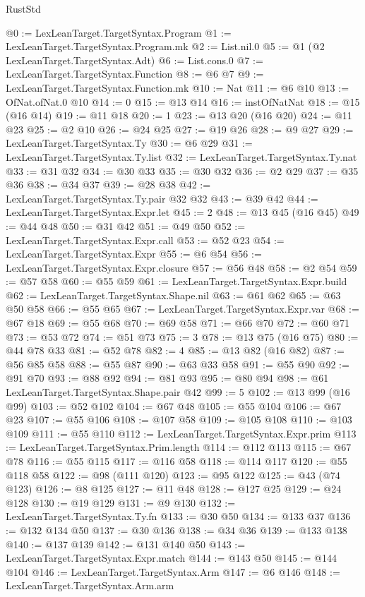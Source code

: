 \begin{lexlean}{RustStd}
\begin{coremodule}
{\begin{coremodule}
{{{{{{{{{{{{{@0 := LexLeanTarget.TargetSyntax.Program
@1 := LexLeanTarget.TargetSyntax.Program.mk
@2 := List.nil.{0}
@5 := @1 (@2 LexLeanTarget.TargetSyntax.Adt)
@6 := List.cons.{0}
@7 := LexLeanTarget.TargetSyntax.Function
@8 := @6 @7
@9 := LexLeanTarget.TargetSyntax.Function.mk
@10 := Nat
@11 := @6 @10
@13 := OfNat.ofNat.{0} @10
@14 := 0
@15 := @13 @14
@16 := instOfNatNat
@18 := @15 (@16 @14)
@19 := @11 @18
@20 := 1
@23 := @13 @20 (@16 @20)
@24 := @11 @23
@25 := @2 @10
@26 := @24 @25
@27 := @19 @26
@28 := @9 @27
@29 := LexLeanTarget.TargetSyntax.Ty
@30 := @6 @29
@31 := LexLeanTarget.TargetSyntax.Ty.list
@32 := LexLeanTarget.TargetSyntax.Ty.nat
@33 := @31 @32
@34 := @30 @33
@35 := @30 @32
@36 := @2 @29
@37 := @35 @36
@38 := @34 @37
@39 := @28 @38
@42 := LexLeanTarget.TargetSyntax.Ty.pair @32 @32
@43 := @39 @42
@44 := LexLeanTarget.TargetSyntax.Expr.let
@45 := 2
@48 := @13 @45 (@16 @45)
@49 := @44 @48
@50 := @31 @42
@51 := @49 @50
@52 := LexLeanTarget.TargetSyntax.Expr.call
@53 := @52 @23
@54 := LexLeanTarget.TargetSyntax.Expr
@55 := @6 @54
@56 := LexLeanTarget.TargetSyntax.Expr.closure
@57 := @56 @48
@58 := @2 @54
@59 := @57 @58
@60 := @55 @59
@61 := LexLeanTarget.TargetSyntax.Expr.build
@62 := LexLeanTarget.TargetSyntax.Shape.nil
@63 := @61 @62
@65 := @63 @50 @58
@66 := @55 @65
@67 := LexLeanTarget.TargetSyntax.Expr.var
@68 := @67 @18
@69 := @55 @68
@70 := @69 @58
@71 := @66 @70
@72 := @60 @71
@73 := @53 @72
@74 := @51 @73
@75 := 3
@78 := @13 @75 (@16 @75)
@80 := @44 @78 @33
@81 := @52 @78
@82 := 4
@85 := @13 @82 (@16 @82)
@87 := @56 @85 @58
@88 := @55 @87
@90 := @63 @33 @58
@91 := @55 @90
@92 := @91 @70
@93 := @88 @92
@94 := @81 @93
@95 := @80 @94
@98 := @61 LexLeanTarget.TargetSyntax.Shape.pair @42
@99 := 5
@102 := @13 @99 (@16 @99)
@103 := @52 @102
@104 := @67 @48
@105 := @55 @104
@106 := @67 @23
@107 := @55 @106
@108 := @107 @58
@109 := @105 @108
@110 := @103 @109
@111 := @55 @110
@112 := LexLeanTarget.TargetSyntax.Expr.prim
@113 := LexLeanTarget.TargetSyntax.Prim.length
@114 := @112 @113
@115 := @67 @78
@116 := @55 @115
@117 := @116 @58
@118 := @114 @117
@120 := @55 @118 @58
@122 := @98 (@111 @120)
@123 := @95 @122
@125 := @43 (@74 @123)
@126 := @8 @125
@127 := @11 @48
@128 := @127 @25
@129 := @24 @128
@130 := @19 @129
@131 := @9 @130
@132 := LexLeanTarget.TargetSyntax.Ty.fn
@133 := @30 @50
@134 := @133 @37
@136 := @132 @134 @50
@137 := @30 @136
@138 := @34 @36
@139 := @133 @138
@140 := @137 @139
@142 := @131 @140 @50
@143 := LexLeanTarget.TargetSyntax.Expr.match
@144 := @143 @50
@145 := @144 @104
@146 := LexLeanTarget.TargetSyntax.Arm
@147 := @6 @146
@148 := LexLeanTarget.TargetSyntax.Arm.arm
}}}}}}}}}}}}}
\end{coremodule}}
\end{coremodule}
\end{lexlean}
